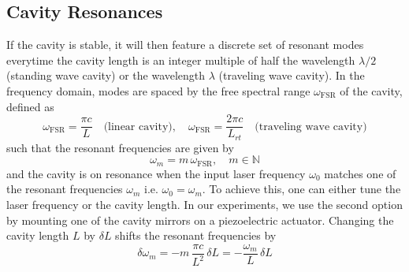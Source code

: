 \subsection{Cavity Resonances}
If the cavity is stable, it will then feature a discrete set of resonant modes everytime the cavity length is an integer multiple of half the wavelength $\lambda/2$ (standing wave cavity) or the wavelength $\lambda$ (traveling wave cavity). In the frequency domain, modes are spaced by the free spectral range $\omega_{\mathrm{FSR}}$ of the cavity, defined as
\begin{equation}
  \omega_{\mathrm{FSR}} = \frac{\pi c}{L} \quad \text{(linear cavity)}, \quad \omega_{\mathrm{FSR}} = \frac{2 \pi c}{L_{rt}} \quad \text{(traveling wave cavity)}
\end{equation}
such that the resonant frequencies are given by
\begin{equation}
  \omega_m = m \, \omega_{\mathrm{FSR}}, \quad m \in \mathbb{N}
\end{equation}
and the cavity is on resonance when the input laser frequency $\omega_0$ matches one of the resonant frequencies $\omega_m$ i.e. $\omega_0 = \omega_m$. To achieve this, one can either tune the laser frequency or the cavity length. In our experiments, we use the second option by mounting one of the cavity mirrors on a piezoelectric actuator. Changing the cavity length $L$ by $\delta L$ shifts the resonant frequencies by
\begin{equation}
  \delta \omega_m = - m \, \frac{\pi c}{L^2} \, \delta L = - \frac{\omega_m}{L} \, \delta L
\end{equation}

